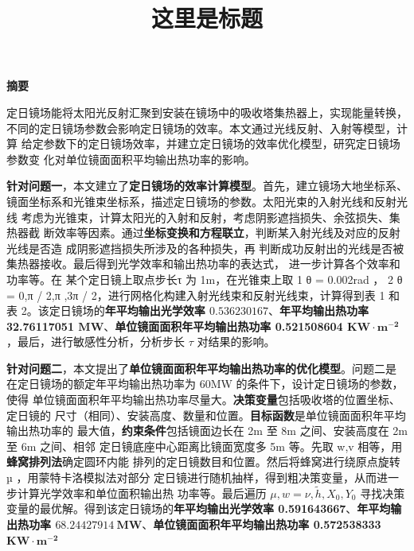 \documentclass[zihao=-4, UTF8]{article}		%
\title{\textbf{这里是标题}}
\author{ }  %
\date{ }  %
\theoremstyle{MyLineTheoremStyle} %
\theoremstyle{MyBlockTheoremStyle} %
\theoremstyle{MySubsubsectionStyle} %
\newcommand{\cnabstractname}{\large 摘要}
\newenvironment{cnabstract}{%
        \par
        \noindent\mbox{}\hfill{\bfseries \cnabstractname}\hfill\mbox{}\par
        }{\par}
\begin{document}
 

\maketitle
\vspace{-80pt}

\begin{cnabstract}{\normalsize 

定日镜场能将太阳光反射汇聚到安装在镜场中的吸收塔集热器上，实现能量转换，
不同的定日镜场参数会影响定日镜场的效率。本文通过光线反射、入射等模型，计算
给定参数下的定日镜场效率，并建立定日镜场的效率优化模型，研究定日镜场参数变
化对单位镜面面积平均输出热功率的影响。 

\textbf{针对问题一}，本文建立了\textbf{定日镜场的效率计算模型}。首先，建立镜场大地坐标系、
镜面坐标系和光锥束坐标系，描述定日镜场的参数。太阳光束的入射光线和反射光线
考虑为光锥束，计算太阳光的入射和反射，考虑阴影遮挡损失、余弦损失、集热器截
断效率等因素。通过\textbf{坐标变换和方程联立}，判断某入射光线及对应的反射光线是否造
成阴影遮挡损失所涉及的各种损失，再
判断成功反射出的光线是否被集热器接收。最后得到光学效率和输出热功率的表达式，
进一步计算各个效率和功率等。在
某个定日镜上取点步长τ 为 1m，在光锥束上取 1 θ = 0.002rad ， 2 θ = 0,π / 2,π ,3π / 2，进行网格化构建入射光线束和反射光线束，计算得到表 1 和表 2。该定日镜场的\textbf{年平均输出光学效率 $0.536230167$}、\textbf{年平均输出热功率 32.76117051 $\mathbf{MW}$}、\textbf{单位镜面面积年平均输出热功率 0.521508604 $\mathbf{KW\cdot m^{-2}}$}，最后，进行敏感性分析，分析步长 $\tau$ 对结果的影响。 

\textbf{针对问题二}，本文提出了\textbf{单位镜面面积年平均输出热功率的优化模型}。问题二是
在定日镜场的额定年平均输出热功率为 60MW 的条件下，设计定日镜场的参数，使得
单位镜面面积年平均输出热功率尽量大。\textbf{决策变量}包括吸收塔的位置坐标、定日镜的
尺寸（相同）、安装高度、数量和位置。\textbf{目标函数}是单位镜面面积年平均输出热功率的
最大值，\textbf{约束条件}包括镜面边长在 2m 至 8m 之间、安装高度在 2m 至 6m 之间、相邻
定日镜底座中心距离比镜面宽度多 5m 等。先取 w,v 相等，用\textbf{蜂窝排列法}确定圆环内能
排列的定日镜数目和位置。然后将蜂窝进行绕原点旋转 µ ，用蒙特卡洛模拟法对部分
定日镜进行随机抽样，得到粗决策变量，从而进一步计算光学效率和单位面积输出热
功率等。最后遍历 $\mu, w = \nu, \tilde{h}, X_0, Y_0 $ 寻找决策变量的最优解。得到该定日镜场的\textbf{年平均输出光学效率 0.591643667}、\textbf{年平均输出热功率 $68.24427914\  \mathbf{MW}$}、\textbf{单位镜面面积年平均输出热功率  0.572538333 $  \mathbf{KW\cdot m^{-2}}$ }

}
\end{cnabstract}
\end{document}
